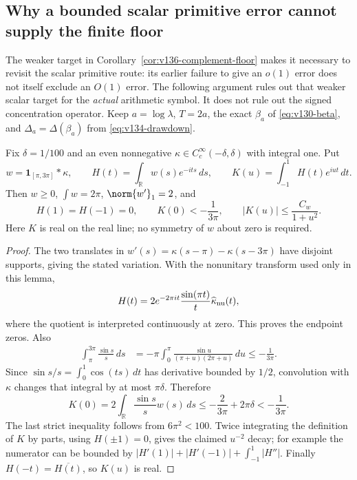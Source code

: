 \subsection*{Why a bounded scalar primitive error cannot supply the finite floor}

The weaker target in Corollary~\ref{cor:v136-complement-floor} makes it
necessary to revisit the scalar primitive route: its earlier failure to
give an $o(1)$ error does not itself exclude an $O(1)$ error. The following
argument rules out that weaker scalar target for the \emph{actual}
arithmetic symbol. It does not rule out the signed concentration operator.
Keep $a=\log\lambda$, $T=2a$, the exact $\beta_a$ of
\eqref{eq:v130-beta}, and $\Delta_a=\Delta(\beta_a)$ from
\eqref{eq:v134-drawdown}.

\begin{lemma}
\label{lem:v137-probe}
Fix $\delta=1/100$ and an even nonnegative
$\kappa\in C_c^\infty(-\delta,\delta)$ with integral one. Put
\[
 w=\mathbf1_{[\pi,3\pi]}*\kappa,\qquad
 H(t)=\int_{\mathbb R}w(s)e^{-its}\,ds,\qquad
 K(u)=\int_{-1}^1H(t)e^{iut}\,dt.
\]
Then $w\ge0$, $\int w=2\pi$, $\norm{w'}_1=2$, and
\begin{equation}\label{eq:v137-probe-properties}
 H(1)=H(-1)=0,\qquad
 K(0)<-\frac1{3\pi},\qquad
 |K(u)|\le\frac{C_w}{1+u^2}.
\end{equation}
Here $K$ is real on the real line; no symmetry of $w$ about zero is
required.
\end{lemma}
\begin{proof}
The two translates in $w'(s)=\kappa(s-\pi)-\kappa(s-3\pi)$ have
disjoint supports, giving the stated variation. With the nonunitary
transform used only in this lemma,
\[
 H(t)=2e^{-2\pi it}\frac{\sin(\pi t)}{t}\widehat\kappa_{\rm nu}(t),
\]
where the quotient is interpreted continuously at zero. This proves
the endpoint zeros. Also
\begin{align*}
 \int_\pi^{3\pi}\frac{\sin s}{s}\,ds
 &=-\pi\int_0^\pi
       \frac{\sin u}{(\pi+u)(2\pi+u)}\,du
 \le-\frac1{3\pi}.
\end{align*}
Since $\sin s/s=\int_0^1\cos(ts)\,dt$ has derivative bounded by
$1/2$, convolution with $\kappa$ changes that integral by at most
$\pi\delta$. Therefore
\[
 K(0)=2\int_{\mathbb R}\frac{\sin s}{s}w(s)\,ds
 \le-\frac2{3\pi}+2\pi\delta<-\frac1{3\pi}.
\]
The last strict inequality follows from $6\pi^2<100$.
Twice integrating the definition of $K$ by parts, using $H(\pm1)=0$,
gives the claimed $u^{-2}$ decay; for example the numerator can be
bounded by $|H'(1)|+|H'(-1)|+\int_{-1}^1|H''|$.
Finally $H(-t)=\overline{H(t)}$, so $K(u)$ is real.
\end{proof}

